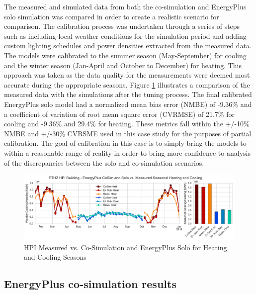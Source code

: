 \documentclass{tBPS2e}
\theoremstyle{plain}
\theoremstyle{definition}
\theoremstyle{remark}
\begin{document}
The measured and simulated data from both the co-simulation and EnergyPlus solo simulation was compared in order to create a realistic scenario for comparison. The calibration process was undertaken through a series of steps such as including local weather conditions for the simulation period and adding custom lighting schedules and power densities extracted from the measured data. The models were calibrated to the summer season (May-September) for cooling and the winter season (Jan-April and October to December) for heating. This approach was taken as the data quality for the measurements were deemed most accurate during the appropriate seasons. Figure \ref{fig:hpi_measvssim} illustrates a comparison of the measured data with the simulations after the tuning process. The final calibrated EnergyPlus solo model had a normalized mean bias error (NMBE) of -9.36\% and a coefficient of variation of root mean square error (CVRMSE) of 21.7\% for cooling and -9.36\% and 29.4\% for heating. These metrics fall within the +/-10\% NMBE and +/-30\% CVRSME used in this case study for the purposes of partial calibration. The goal of calibration in this case is to simply bring the models to within a reasonable range of reality in order to bring more confidence to analysis of the discrepancies between the solo and co-simulation scenarios.

\begin{figure}[H]
\centering
\includegraphics[scale=0.55]{figures/HPI_MeasvsSim}
\caption{HPI Measured vs. Co-Simulation and EnergyPlus Solo for Heating and Cooling Seasons}
\label{fig:hpi_measvssim}
\end{figure}

\subsection{EnergyPlus co-simulation results}
\end{document}
